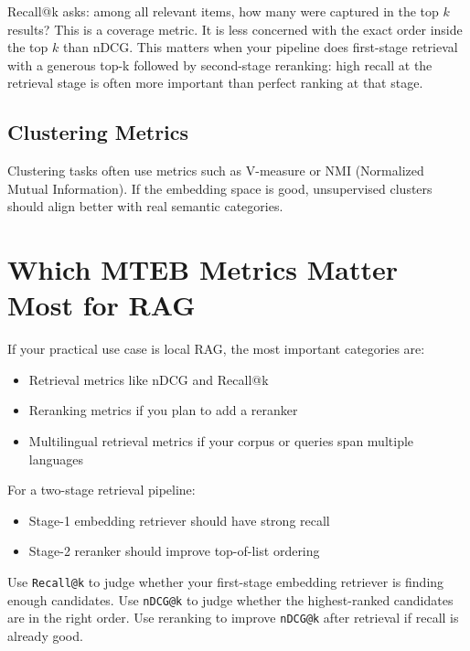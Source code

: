 Recall@k asks: among all relevant items, how many were captured in the top $k$ results?
This is a coverage metric. It is less concerned with the exact order inside the top $k$ than
nDCG. This matters when your pipeline does first-stage retrieval with a generous top-k
followed by second-stage reranking: high recall at the retrieval stage is often more important
than perfect ranking at that stage.

\subsection{Clustering Metrics}

Clustering tasks often use metrics such as V-measure or NMI (Normalized Mutual Information).
If the embedding space is good, unsupervised clusters should align better with real semantic
categories.

\section{Which MTEB Metrics Matter Most for RAG}

If your practical use case is local RAG, the most important categories are:

\begin{itemize}
    \item Retrieval metrics like nDCG and Recall@k
    \item Reranking metrics if you plan to add a reranker
    \item Multilingual retrieval metrics if your corpus or queries span multiple languages
\end{itemize}

For a two-stage retrieval pipeline:

\begin{itemize}
    \item Stage-1 embedding retriever should have strong recall
    \item Stage-2 reranker should improve top-of-list ordering
\end{itemize}

\begin{notebox}
Use \texttt{Recall@k} to judge whether your first-stage embedding retriever is finding enough
candidates. Use \texttt{nDCG@k} to judge whether the highest-ranked candidates are in the
right order. Use reranking to improve \texttt{nDCG@k} after retrieval if recall is already good.
\end{notebox}

